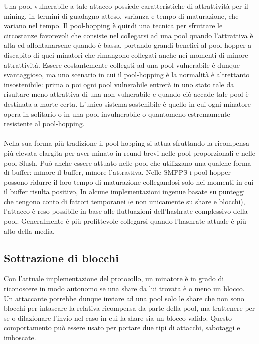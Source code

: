 Una pool vulnerabile a tale attacco possiede caratteristiche di attrattività per il mining, in termini di guadagno atteso, varianza e tempo di maturazione, che variano nel tempo. Il pool-hopping è quindi una tecnica per sfruttare le circostanze favorevoli che consiste nel collegarsi ad una pool quando l'attrattiva è alta ed allontanarsene quando è bassa, portando grandi benefici al pool-hopper a discapito di quei minatori che rimangono collegati anche nei momenti di minore attrattività.
Essere costantemente collegati ad una pool vulnerabile è dunque svantaggioso, ma uno scenario in cui il pool-hopping è la normalità è altrettanto insostenibile: prima o poi ogni pool vulnerabile entrerà in uno stato tale da risultare meno attrattiva di una non vulnerabile e quando ciò accade tale pool è destinata a morte certa. L'unico sistema sostenibile è quello in cui ogni minatore opera in solitario o in una pool invulnerabile o quantomeno estremamente resistente al pool-hopping.\\\\
Nella sua forma più tradizione il pool-hopping si attua sfruttando la ricompensa più elevata elargita per aver minato in round brevi nelle pool proporzionali e nelle pool Slush.
Può anche essere attuato nelle pool che utilizzano una qualche forma di buffer: minore il buffer, minore l'attrattiva. Nelle SMPPS i pool-hopper possono ridurre il loro tempo di maturazione collegandosi solo nei momenti in cui il buffer risulta positivo,
In alcune implementazioni ingenue basate su punteggi che tengono conto di fattori temporanei (e non unicamente su share e blocchi), l'attacco è reso possibile in base alle fluttuazioni dell'hashrate complessivo della pool. Generalmente è più profittevole collegarsi quando l'hashrate attuale è più alto della media.

\subsection{Sottrazione di blocchi}

Con l'attuale implementazione del protocollo, un minatore è in grado di riconoscere in modo autonomo se una share da lui trovata è o meno un blocco. Un attaccante potrebbe dunque inviare ad una pool solo le share che non sono blocchi per intascare la relativa ricompensa da parte della pool, ma trattenere per se o dilazionare l'invio nel caso in cui la share sia un blocco valido. Questo comportamento può essere usato per portare due tipi di attacchi, sabotaggi e imboscate.

